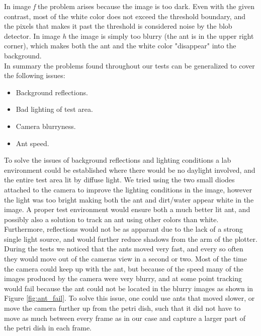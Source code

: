 In image \emph{f} the problem arises because the image is too dark. Even with the given contrast, most of the white color does not exceed the threshold boundary, and the pixels that makes it past the threshold is considered noise by the blob detector. In image \emph{h} the image is simply too blurry (the ant is in the upper right corner), which makes both the ant and the white color "disappear" into the background.\\

In summary the problems found throughout our tests can be generalized to cover the following issues:

\begin{itemize}
    \item Background reflections.
    \item Bad lighting of test area.
    \item Camera blurryness.
    \item Ant speed.
\end{itemize}

To solve the issues of background reflections and lighting conditions a lab environment could be established where there would be no daylight involved, and the entire test area lit by diffuse light. We tried using the two small diodes attached to the camera to improve the lighting conditions in the image, however the light was too bright making both the ant and dirt/water appear white in the image. A proper test environment would ensure both a much better lit ant, and possibly also a solution to track an ant using other colors than white. Furthermore, reflections would not be as apparant due to the lack of a strong single light source, and would further reduce shadows from the arm of the plotter.\\

During the tests we noticed that the ants moved very fast, and every so often they would move out of the cameras view in a second or two. Most of the time the camera could keep up with the ant, but because of the speed many of the images produced by the camera were very blurry, and at some point tracking would fail because the ant could not be located in the blurry images as shown in Figure \ref{fig:ant_fail}. To solve this issue, one could use ants that moved slower, or move the camera further up from the petri dish, such that it did not have to move as much between every frame as in our case and capture a larger part of the petri dish in each frame. \\

